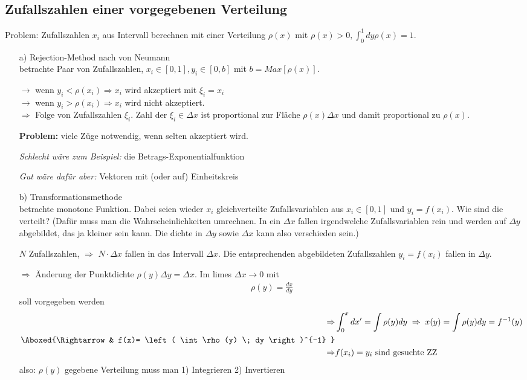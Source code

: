 \documentclass[12pt]{article}
\begin{document}
 \subsection{Zufallszahlen einer vorgegebenen Verteilung}
 Problem: %
 Zufallszahlen $x_i$ aus Intervall berechnen mit einer Verteilung $\rho(x)$ mit $\rho(x)>0, \int_0^1 dy \rho(x)=1$.
 \begin{itemize}
 \item[a)] Rejection-Method nach von Neumann \\
 betrachte Paar von Zufallszahlen, $x_i \in [0,1], y_i \in [0,b]$ mit $b=Max[\rho(x)]$.
 
$\to$ wenn $y_i < \rho(x_i) \Rightarrow x_i$ wird akzeptiert mit $\xi_i=x_i$\\
 $\to$ wenn $y_i > \rho(x_i) \Rightarrow x_i$ wird nicht akzeptiert. \\
 
 $\Rightarrow$ Folge von Zufallszahlen $\xi_i$. Zahl der $\xi_i \in \Delta x$ ist proportional zur Fläche $\rho(x) \Delta x$ und damit proportional zu $\rho(x)$.
 
 \textbf{Problem:} viele Züge notwendig, wenn selten akzeptiert wird. 
 
 \textit{Schlecht wäre zum Beispiel:} die Betrags-Exponentialfunktion
 
\textit{Gut wäre dafür aber:}
Vektoren mit (oder auf) Einheitskreis

\item[b)] Transformationsmethode \\
betrachte monotone Funktion. Dabei seien wieder $x_i$ gleichverteilte Zufallsvariablen aus $x_i \in [0,1]$ und $y_i = f(x_i)$. Wie sind die verteilt? (Dafür muss man die Wahrscheinlichkeiten umrechnen. In ein $\Delta x$ fallen irgendwelche Zufallsvariablen rein und werden auf $\Delta y$ abgebildet, das ja kleiner sein kann. Die dichte in $\Delta y$ sowie $\Delta x$ kann also verschieden sein.) %

$N$ Zufallszahlen, $\Rightarrow$ $N \cdot \Delta x$ fallen in das Intervall $\Delta x$. Die entsprechenden abgebildeten Zufallszahlen $y_i=f(x_i)$ fallen in $\Delta y$.

$\Rightarrow$ Änderung der Punktdichte $\rho(y)\Delta y = \Delta x$. Im limes $\Delta x \to 0$ mit 
\begin{align*}
\rho(y)=\frac{dx}{dy}
\end{align*}
soll vorgegeben werden
\begin{align}
\Rightarrow & \int_0^x dx' = \int \rho(y) dy \; \Rightarrow \; x(y) = \int \rho(y) dy = f^{-1}(y) \\
\Aboxed{\Rightarrow & f(x)= \left( \int \rho(y) \; dy \right)^{-1} }\\
\Rightarrow & f(x_i)=y_i \mbox{ sind gesuchte ZZ}
\end{align} %
also: $\rho(y)$ gegebene Verteilung muss man 1) Integrieren 2) Invertieren
 

\end{itemize}
\end{document}
